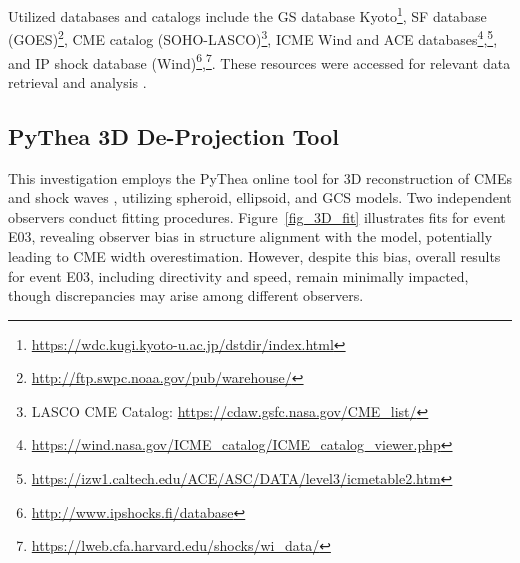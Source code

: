 Utilized databases and catalogs include the GS database Kyoto\footnote{\url{https://wdc.kugi.kyoto-u.ac.jp/dstdir/index.html}}, SF database (GOES)\footnote{\url{http://ftp.swpc.noaa.gov/pub/warehouse/}}, CME catalog (SOHO-LASCO)\footnote{LASCO CME Catalog: \url{https://cdaw.gsfc.nasa.gov/CME_list/}}, ICME Wind and ACE databases\footnote{\url{https://wind.nasa.gov/ICME_catalog/ICME_catalog_viewer.php}},\footnote{\url{https://izw1.caltech.edu/ACE/ASC/DATA/level3/icmetable2.htm}}, and IP shock database (Wind)\footnote{\url{http://www.ipshocks.fi/database}},\footnote{\url{https://lweb.cfa.harvard.edu/shocks/wi_data/}}. These resources were accessed for relevant data retrieval and analysis \citep{selvakumaran_2016}.

\subsection{PyThea 3D De-Projection Tool}
This investigation employs the PyThea online tool for 3D reconstruction of CMEs and shock waves \citep{kouloumvakos_2022}, utilizing spheroid, ellipsoid, and GCS models. Two independent observers conduct fitting procedures. Figure~\ref{fig_3D_fit} illustrates fits for event E03, revealing observer bias in structure alignment with the model, potentially leading to CME width overestimation. However, despite this bias, overall results for event E03, including directivity and speed, remain minimally impacted, though discrepancies may arise among different observers.

